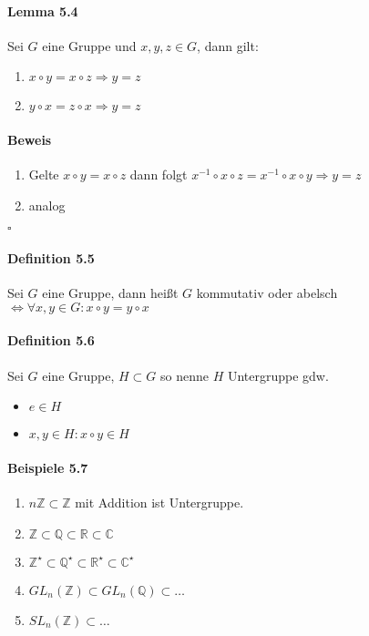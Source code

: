\documentclass{scrartcl}
\begin{document}
\paragraph{Lemma 5.4} Sei $G$ eine Gruppe und $x,y,z \in G$, dann gilt:
\begin{enumerate}
\item $x \circ y = x \circ z \Rightarrow y = z$
\item $y \circ x = z \circ x \Rightarrow y = z$
\end{enumerate}
\paragraph{Beweis}
\begin{enumerate}
\item Gelte $x \circ y = x \circ z$ dann folgt $x^{-1} \circ x \circ z = x^{-1}
  \circ x \circ y \Rightarrow y = z$
\item analog
\end{enumerate}
\hfill $\square$

\paragraph{Definition 5.5} Sei $G$ eine Gruppe, dann heißt $G$ kommutativ oder
abelsch $\Leftrightarrow \forall x,y \in G: x \circ y = y \circ x$

\paragraph{Definition 5.6} Sei $G$ eine Gruppe, $H \subset G$ so nenne $H$
Untergruppe gdw.
\begin{itemize}
\item $e \in H$
\item $x,y \in H: x \circ y \in H$
\end{itemize}

\paragraph{Beispiele 5.7}
\begin{enumerate}
\item $n\mathbb{Z} \subset \mathbb{Z}$ mit Addition ist Untergruppe.
\item $\mathbb{Z} \subset \mathbb{Q} \subset \mathbb{R} \subset \mathbb{C}$
\item $\mathbb{Z}^\star \subset \mathbb{Q}^\star \subset \mathbb{R}^\star
  \subset \mathbb{C}^\star$
\item $GL_n(\mathbb{Z}) \subset GL_n(\mathbb{Q}) \subset \dots$
\item $SL_n(\mathbb{Z}) \subset \dots$
\end{enumerate}
\end{document}
